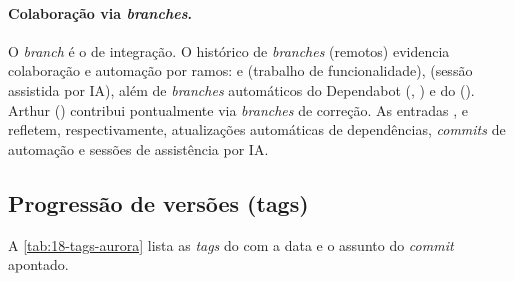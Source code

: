 \medskip

\paragraph{Colaboração via \emph{branches}.} O \emph{branch}  é o de
integração. O histórico de \emph{branches} (remotos) evidencia colaboração e
automação por ramos:  e 
(trabalho de funcionalidade),  (sessão
assistida por IA), além de \emph{branches} automáticos do Dependabot
(, ) e do
 (). Arthur
() contribui pontualmente via \emph{branches} de correção. As
entradas ,  e 
refletem, respectivamente, atualizações automáticas de dependências, \emph{commits}
de automação e sessões de assistência por IA.

\subsection{Progressão de versões (tags)}
\label{sub:18-versoes}

A \autoref{tab:18-tags-aurora} lista as \emph{tags} do  com a data
e o assunto do \emph{commit} apontado.

